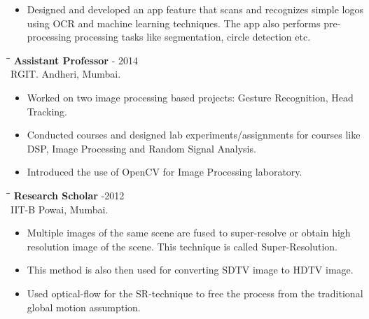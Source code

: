 \documentclass{res}
\begin{document}
\begin{resume}
\begin{itemize}
        \item Designed and developed an app feature that scans and recognizes
        simple logos using OCR and machine learning techniques. The app also performs pre-processing processing tasks like segmentation, circle detection etc. 
    \end{itemize}

   \begin{tabbing}
   \hspace{2.3in}\= \hspace{2.6in}\= \kill %
    {\bf Assistant Professor} \> -  2014\\
                     RGIT.\>     \>Andheri, Mumbai.
   \end{tabbing}
   \begin{itemize}
\item Worked on  two image processing based projects: Gesture Recognition, Head Tracking.   
\item Conducted courses and designed  lab experiments/assignments for courses
like DSP, Image Processing and Random Signal Analysis. 
\item Introduced the use of OpenCV for Image Processing laboratory.
\end{itemize}

   \begin{tabbing}%
   \hspace{2.3in}\= \hspace{2.6in}\= \kill %
   {\bf Research Scholar}  \>  -2012\\
                IIT-B\>    \>Powai, Mumbai.
   \end{tabbing}
 \begin{itemize}
\item Multiple images of the same scene are fused to super-resolve or obtain
high resolution image of the scene. This technique is called Super-Resolution.
 \item This method is also then used for
converting SDTV image to HDTV image.
\item  Used optical-flow for  the SR-technique to  free the process  from the traditional global motion assumption. 
\end{itemize}


\end{resume}
\end{document}
